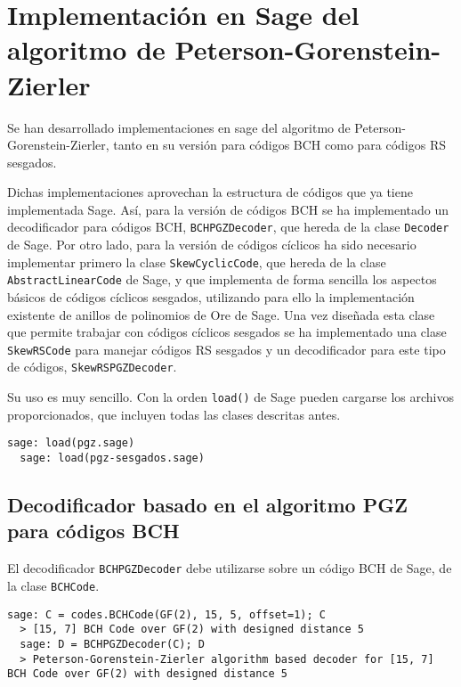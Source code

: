 \chapter[Implementación en Sage del algoritmo PGZ]{Implementación en Sage del algoritmo de Peterson-Gorenstein-Zierler}
\label{annex:pgz-sage}

Se han desarrollado implementaciones en sage del algoritmo de Peterson-Gorenstein-Zierler, tanto en su versión para códigos BCH como para códigos RS sesgados.

Dichas implementaciones aprovechan la estructura de códigos que ya tiene implementada Sage.
Así, para la versión de códigos BCH se ha implementado un decodificador para códigos BCH, \texttt{BCHPGZDecoder}, que hereda de la clase \texttt{Decoder} de Sage.
Por otro lado, para la versión de códigos cíclicos ha sido necesario implementar primero la clase \texttt{SkewCyclicCode}, que hereda de la clase \texttt{AbstractLinearCode} de Sage, y que implementa de forma sencilla los aspectos básicos de códigos cíclicos sesgados, utilizando para ello la implementación existente de anillos de polinomios de Ore de Sage.
Una vez diseñada esta clase que permite trabajar con códigos cíclicos sesgados se ha implementado una clase \texttt{SkewRSCode} para manejar códigos RS sesgados y un decodificador para este tipo de códigos, \texttt{SkewRSPGZDecoder}.

Su uso es muy sencillo.
Con la orden \texttt{load()} de Sage pueden cargarse los archivos proporcionados, que incluyen todas las clases descritas antes.

\begin{lstlisting}[gobble=2]
  sage: load(pgz.sage)
  sage: load(pgz-sesgados.sage)
\end{lstlisting}

\section{Decodificador basado en el algoritmo PGZ para códigos BCH}

El decodificador \texttt{BCHPGZDecoder} debe utilizarse sobre un código BCH de Sage, de la clase \texttt{BCHCode}.

\begin{lstlisting}[gobble=2]
  sage: C = codes.BCHCode(GF(2), 15, 5, offset=1); C
  > [15, 7] BCH Code over GF(2) with designed distance 5
  sage: D = BCHPGZDecoder(C); D
  > Peterson-Gorenstein-Zierler algorithm based decoder for [15, 7] BCH Code over GF(2) with designed distance 5
\end{lstlisting}




%
